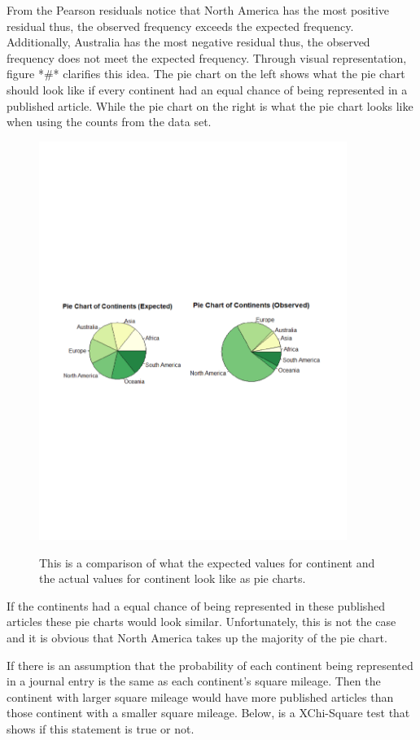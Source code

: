 \documentclass[12pt, letterpaper]{article}
\begin{document}
From the Pearson residuals notice that North America has the most positive residual thus, the observed frequency exceeds the expected frequency. Additionally, Australia has the most negative residual thus, the observed frequency does not meet the expected frequency. Through visual representation, figure *#* clarifies this idea. The pie chart on the left shows what the pie chart should look like if every continent had an equal chance of being represented in a published article. While the pie chart on the right is what the pie chart looks like when using the counts from the data set. 
\begin{figure}[h]
\begin{center}
\includegraphics[width=10cm]{ContinentPieChart.pdf}
\label{fig: Continent Pie Chart}
\caption{This is a comparison of what the expected values for continent and the actual values for continent look like as pie charts.}
\end{center}
\end{figure}

If the continents had a equal chance of being represented in these published articles these pie charts would look similar. Unfortunately, this is not the case and it is obvious that North America takes up the majority of the pie chart.

If there is an assumption that the probability of each continent being represented in a journal entry is the same as each continent's square mileage. Then the continent with larger square mileage would have more published articles than those continent with a smaller square mileage. Below, is a XChi-Square test that shows if this statement is true or not.
 
\end{document}

